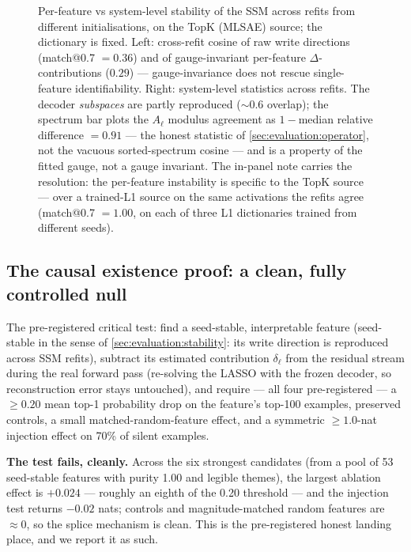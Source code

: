 \begin{figure}[t]
  \centering
  
  \caption{Per-feature vs system-level stability of the SSM across refits
  from different initialisations, on the TopK (MLSAE) source; the dictionary
  is fixed. Left: cross-refit
  cosine of raw write directions (match@0.7 $=0.36$)
  and of gauge-invariant per-feature $\Delta$-contributions ($0.29$) ---
  gauge-invariance does not rescue single-feature identifiability. Right:
  system-level statistics across refits. The decoder \emph{subspaces} are
  partly reproduced (${\sim}0.6$ overlap); the spectrum bar plots the
  $A_\ell$ modulus agreement as $1-{}$median
  relative difference $=0.91$ --- the honest statistic of
  \cref{sec:evaluation:operator}, not the vacuous sorted-spectrum cosine ---
  and is a property of the fitted gauge, not a gauge invariant. The
  in-panel note carries the resolution: the
  per-feature instability is specific to the TopK source --- over a
  trained-L1 source on the same activations the refits agree (match@0.7
  $=1.00$, on each of three L1 dictionaries trained from different seeds).}
  \label{fig:stability}
\end{figure}

\subsection{The causal existence proof: a clean, fully controlled null}
\label{sec:evaluation:causal}

The pre-registered critical test: find a seed-stable, interpretable feature
(seed-stable in the sense of \cref{sec:evaluation:stability}: its write
direction is reproduced across SSM refits),
subtract its estimated contribution $\delta_\ell$ from the residual stream
during the real forward pass (re-solving the LASSO with the frozen decoder,
so reconstruction error stays untouched), and require --- all four
pre-registered --- a $\ge 0.20$ mean top-1 probability drop on the feature's
top-100 examples, preserved controls, a small matched-random-feature effect,
and a symmetric $\ge 1.0$-nat injection effect on 70\% of silent examples.

\textbf{The test fails, cleanly.} Across the six strongest candidates (from a
pool of 53 seed-stable features with purity 1.00 and legible themes), the
largest ablation effect is \textbf{$+0.024$} --- roughly an eighth of the
0.20 threshold ---
and the injection test returns $-0.02$ nats; controls and magnitude-matched
random features are $\approx 0$, so the splice mechanism is clean. This is
the pre-registered honest landing place, and we report it as such.

